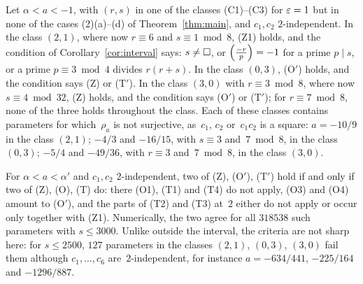 \begin{remark}
  \label{rem:interval}
  Let $\alpha < a < -1$, with $(r, s)$ in one of the classes (C1)--(C3) for $\varepsilon = 1$ but in none
  of the cases (2)(a)--(d) of Theorem~\ref{thm:main}, and $c_1, c_2$ $2$-independent. In the
  class $(2,1)$, where now $r \equiv 6$ and $s \equiv 1 \bmod 8$, (Z1) holds, and the condition of
  Corollary~\ref{cor:interval} says: $s \ne \square$, or $\left(\frac{-r}{p}\right) = -1$ for a prime $p \mid s$, or
  a prime $p \equiv 3 \bmod 4$ divides $r(r + s)$. In the class $(0,3)$, (O$'$) holds, and the
  condition says (Z) or (T$'$). In the class $(3,0)$ with $r \equiv 3 \bmod 8$, where now
  $s \equiv 4 \bmod 32$, (Z) holds, and the condition says (O$'$) or (T$'$); for
  $r \equiv 7 \bmod 8$, none of the three holds throughout the class. Each of these classes
  contains parameters for which~$\rho_a$ is not surjective, as~$c_1$, $c_2$ or~$c_1 c_2$ is a
  square: $a = -10/9$ in the class $(2,1)$; $-4/3$ and $-16/15$, with $s \equiv 3$
  and~$7 \bmod 8$, in the class $(0,3)$; $-5/4$ and $-49/36$, with $r \equiv 3$ and~$7 \bmod 8$, in
  the class $(3,0)$.

  For $\alpha < a < \alpha'$ and $c_1, c_2$ $2$-independent, two of (Z), (O$'$), (T$'$) hold if and
  only if two of (Z), (O), (T) do: there (O1), (T1) and (T4) do not apply, (O3) and (O4)
  amount to (O$'$), and the parts of (T2) and (T3) at~$2$ either do not apply or occur only
  together with (Z1). Numerically, the two agree for all $318538$ such parameters with
  $s \le 3000$. Unlike outside the interval, the criteria are not sharp here: for $s \le 2500$,
  $127$ parameters in the classes $(2,1)$, $(0,3)$, $(3,0)$ fail them although
  $c_1, \dots, c_6$ are~$2$-independent, for instance $a = -634/441$, $-225/164$ and $-1296/887$.
\end{remark}

